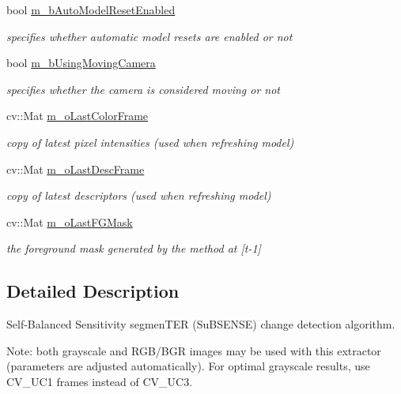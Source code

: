 \begin{DoxyCompactItemize}
bool \mbox{\hyperlink{class_background_subtractor_l_b_s_p_a9d260f4e42e3fc79fb21af950ca9087a}{m\+\_\+b\+Auto\+Model\+Reset\+Enabled}}
\begin{DoxyCompactList}\small\item\em specifies whether automatic model resets are enabled or not \end{DoxyCompactList}\item 
bool \mbox{\hyperlink{class_background_subtractor_l_b_s_p_a5b1ec2694ae59661bb146ad0d4d49811}{m\+\_\+b\+Using\+Moving\+Camera}}
\begin{DoxyCompactList}\small\item\em specifies whether the camera is considered moving or not \end{DoxyCompactList}\item 
cv\+::\+Mat \mbox{\hyperlink{class_background_subtractor_l_b_s_p_ab1dc003792ab1d0b881a6fd10e0e29b3}{m\+\_\+o\+Last\+Color\+Frame}}
\begin{DoxyCompactList}\small\item\em copy of latest pixel intensities (used when refreshing model) \end{DoxyCompactList}\item 
cv\+::\+Mat \mbox{\hyperlink{class_background_subtractor_l_b_s_p_a9c637c0b87cac495887295690d83ba13}{m\+\_\+o\+Last\+Desc\+Frame}}
\begin{DoxyCompactList}\small\item\em copy of latest descriptors (used when refreshing model) \end{DoxyCompactList}\item 
cv\+::\+Mat \mbox{\hyperlink{class_background_subtractor_l_b_s_p_adb6dc0af596c5592c91f9d8faa5c8a4b}{m\+\_\+o\+Last\+F\+G\+Mask}}
\begin{DoxyCompactList}\small\item\em the foreground mask generated by the method at \mbox{[}t-\/1\mbox{]} \end{DoxyCompactList}\end{DoxyCompactItemize}


\subsection{Detailed Description}
Self-\/\+Balanced Sensitivity segmen\+T\+ER (Su\+B\+S\+E\+N\+SE) change detection algorithm.

Note\+: both grayscale and R\+G\+B/\+B\+GR images may be used with this extractor (parameters are adjusted automatically). For optimal grayscale results, use C\+V\+\_\+U\+C1 frames instead of C\+V\+\_\+U\+C3.

